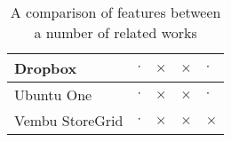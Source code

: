\begin{bibunit}[plain]
\begin{table}[H]
\begin{tabular}{ | l | p{1.5cm} | p{1.5cm} | p{1.5cm} | p{1.5cm} | }
        Dropbox                 & $\cdot$   & $\times$  & $\times$  & $\cdot$
            \\ \hline

        Ubuntu One              & $\cdot$   & $\times$  & $\times$  & $\cdot$
            \\ \hline

        Vembu StoreGrid         & $\cdot$   & $\times$  & $\times$  & $\times$
            \\ \hline
    \end{tabular}
    \caption{A comparison of features between a number of related works}
    \label{tab:feature-comparison}
\end{table}

\putbib[research]

\end{bibunit}
